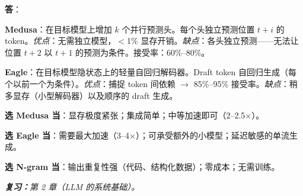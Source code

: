 \begin{questionbox}
\textbf{答}：

\textbf{Medusa}：在目标模型上增加 $k$ 个并行预测头。每个头独立预测位置 $t+i$ 的 token。\emph{优点}：无需独立模型，$<$1\% 显存开销。\emph{缺点}：各头独立预测——无法让位置 $t+2$ 以 $t+1$ 的预测为条件。接受率：60\%--80\%。

\textbf{Eagle}：在目标模型隐状态上的轻量自回归解码器。Draft token 自回归生成（每个以前一个为条件）。\emph{优点}：捕捉 token 间依赖 $\to$ 85\%--95\% 接受率。\emph{缺点}：稍多显存（小型解码器）以及顺序的 draft 生成。

\textbf{选 Medusa 当}：显存极度紧张；集成简单；中等加速即可（2--2.5$\times$）。

\textbf{选 Eagle 当}：需要最大加速（3--4$\times$）；可承受额外的小模型；延迟敏感的单流生成。

\textbf{选 N-gram 当}：输出重复性强（代码、结构化数据）；零成本；无需训练。

\emph{\textbf{复习：}第 2 章（LLM 的系统基础）。}
\end{questionbox}

